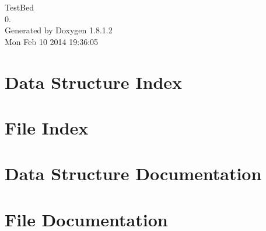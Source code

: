 \documentclass{book}
\begin{document}
\hypersetup{pageanchor=false,citecolor=blue}
\begin{titlepage}
\vspace*{7cm}
\begin{center}
{\Large Test\-Bed \\[1ex]\large 0. }\\
\vspace*{1cm}
{\large Generated by Doxygen 1.8.1.2}\\
\vspace*{0.5cm}
{\small Mon Feb 10 2014 19:36:05}\\
\end{center}
\end{titlepage}
\clearemptydoublepage
{}
\tableofcontents
\clearemptydoublepage
{}
\hypersetup{pageanchor=true,citecolor=blue}
\chapter{Data Structure Index}

\chapter{File Index}

\chapter{Data Structure Documentation}
















\chapter{File Documentation}
































\printindex
\end{document}

